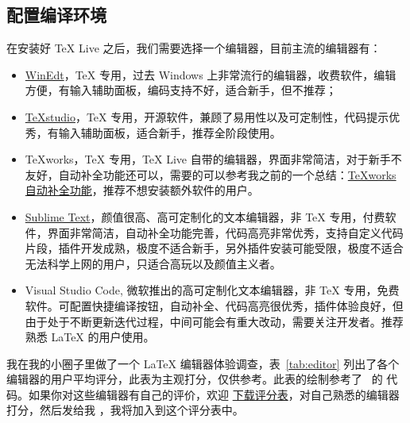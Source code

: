 \documentclass[10pt,a4paper]{dlove}
\begin{document}
\subsection{配置编译环境}
在安装好 \TeX{} Live 之后，我们需要选择一个编辑器，目前主流的编辑器有：
\begin{itemize}
  \item \href{http://www.winedt.com/}{WinEdt}，\TeX{} 专用，过去 Windows 上非常流行的编辑器，收费软件，编辑方便，有输入辅助面板，编码支持不好，适合新手，但不推荐；
  \item \href{http://texstudio.sourceforge.net/}{\TeX{}studio}，\TeX{} 专用，开源软件，兼顾了易用性以及可定制性，代码提示优秀，有输入辅助面板，适合新手，推荐全阶段使用。
  \item \TeX{}works，\TeX{} 专用，\TeX{} Live 自带的编辑器，界面非常简洁，对于新手不友好，自动补全功能还可以，需要的可以参考我之前的一个总结：\href{https://github.com/EthanDeng/texworks-autocomplete}{\TeX{}works 自动补全功能}，推荐不想安装额外软件的用户。
  \item \href{http://www.sublimetext.com/}{Sublime Text}，颜值很高、高可定制化的文本编辑器，非 \TeX{} 专用，付费软件，界面非常简洁，自动补全功能完善，代码高亮非常优秀，支持自定义代码片段，插件开发成熟，极度不适合新手，另外插件安装可能受限，极度不适合无法科学上网的用户，只适合高玩以及颜值主义者。
  \item Visual Studio Code, 微软推出的高可定制化文本编辑器，非 \TeX{} 专用，免费软件。可配置快捷编译按钮，自动补全、代码高亮很优秀，插件体验良好，但由于处于不断更新迭代过程，中间可能会有重大改动，需要关注开发者。推荐熟悉 \LaTeX{} 的用户使用。
\end{itemize}

我在我的小圈子里做了一个 \LaTeX{} 编辑器体验调查，表~\ref{tab:editor} 列出了各个编辑器的用户平均评分，此表为主观打分，仅供参考。此表的绘制参考了~\cite{jake2019} 的 \TikZ{} 代码。如果你对这些编辑器有自己的评价，欢迎 \href{https://github.com/EthanDeng/mhlatex4econ/blob/master/archive/LaTeX 编辑器对比评分表.xlsx}{下载评分表}，对自己熟悉的编辑器打分，然后发给我 ，我将加入到这个评分表中。
\end{document}
